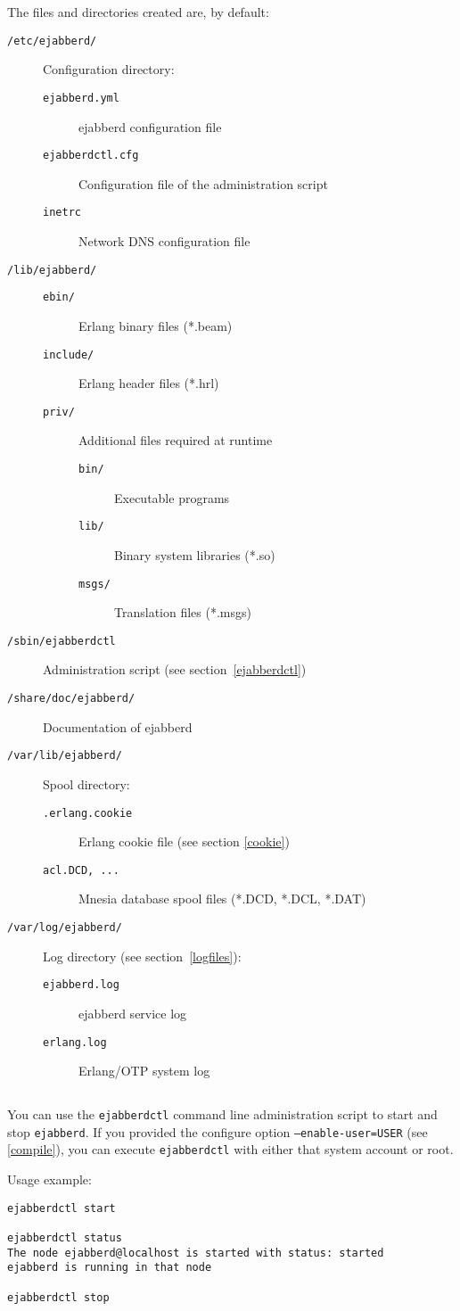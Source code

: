 \documentclass[a4paper,10pt]{book}
\newcommand{\ind}[1]{\begin{latexonly}\index{#1}\end{latexonly}}
\newcommand{\makesubsection}[2]{ \aname{#1}{} \subsection{\ahrefloc{#1}{#2}} \label{#1} }
\newcommand{\bracehack}{\def\{{\char"7B}\def\}{\char"7D}}
\newcommand{\titem}[1]{\item[\bracehack\texttt{#1}]}
\newcommand{\term}[1]{\texttt{#1}}
\newcommand{\ejabberd}{\texttt{ejabberd}}
\begin{document}
The files and directories created are, by default:
\begin{description}
	\titem{/etc/ejabberd/} Configuration directory:
		\begin{description}
			\titem{ejabberd.yml} ejabberd configuration file
			\titem{ejabberdctl.cfg} Configuration file of the administration script
			\titem{inetrc} Network DNS configuration file
		\end{description}
	\titem{/lib/ejabberd/}
		\begin{description}
			\titem{ebin/} Erlang binary files (*.beam)
			\titem{include/} Erlang header files (*.hrl)
			\titem{priv/} Additional files required at runtime
				\begin{description}
					\titem{bin/} Executable programs
					\titem{lib/} Binary system libraries (*.so)
					\titem{msgs/} Translation files (*.msgs)
				\end{description}
		\end{description}
	\titem{/sbin/ejabberdctl} Administration script (see section~\ref{ejabberdctl})
	\titem{/share/doc/ejabberd/} Documentation of ejabberd
	\titem{/var/lib/ejabberd/} Spool directory:
		\begin{description}
			\titem{.erlang.cookie} Erlang cookie file (see section \ref{cookie})
			\titem{acl.DCD, ...} Mnesia database spool files (*.DCD, *.DCL, *.DAT)
		\end{description}
	\titem{/var/log/ejabberd/} Log directory (see section~\ref{logfiles}):
		\begin{description}
			\titem{ejabberd.log} ejabberd service log
			\titem{erlang.log} Erlang/OTP system log
		\end{description}
\end{description}


\makesubsection{start}{Start}
\ind{install!start}

You can use the \term{ejabberdctl} command line administration script to start and stop \ejabberd{}.
If you provided the configure option \term{--enable-user=USER} (see \ref{compile}),
you can execute \term{ejabberdctl} with either that system account or root.

Usage example:
\begin{verbatim}
ejabberdctl start

ejabberdctl status
The node ejabberd@localhost is started with status: started
ejabberd is running in that node

ejabberdctl stop
\end{verbatim}
\end{document}
